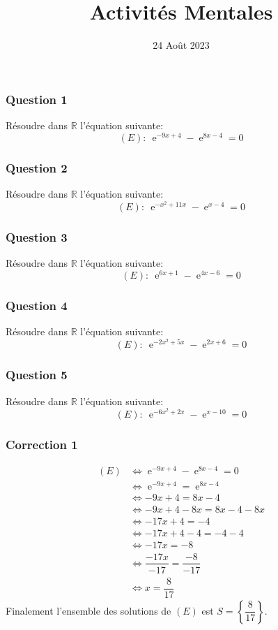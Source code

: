 \documentclass[15pt, mathserif]{beamer}
\title{Activités Mentales}
\date{24 Août 2023}
\DeclareMathOperator{\e}{e}
\begin{document}
\begin{frame}
    \titlepage
\end{frame}

\begin{frame} 
	\frametitle{Question 1}
	Résoudre dans $\mathbb{R}$ l'équation suivante: \[(E):~ \e^{-9x+4}-\e^{8x-4}=0\]\end{frame}


\begin{frame} 
	\frametitle{Question 2}
Résoudre dans $\mathbb{R}$ l'équation suivante: \[(E):~ \e^{ -x^2+11x}-\e^{x-4}=0 \] 

\end{frame}


\begin{frame} 
	\frametitle{Question 3}
	Résoudre dans $\mathbb{R}$ l'équation suivante: \[(E):~ \e^{6x+1}-\e^{4x-6}=0\]\end{frame}


\begin{frame} 
	\frametitle{Question 4}
Résoudre dans $\mathbb{R}$ l'équation suivante: \[(E):~ \e^{ -2x^2+5x}-\e^{2x+6}=0 \] 

\end{frame}


\begin{frame} 
	\frametitle{Question 5}
Résoudre dans $\mathbb{R}$ l'équation suivante: \[(E):~ \e^{ -6x^2+2x}-\e^{x-10}=0 \] 

\end{frame}


\begin{frame}
\vspace{-10mm}
	\frametitle{Correction 1}
	\begin{align*} (E)& \Leftrightarrow \e^{-9x+4}-\e^{8x-4}=0 \\
		&\Leftrightarrow \e^{-9x+4}=\e^{8x-4} \\
		&\Leftrightarrow -9x+4=8x-4\\
		&\Leftrightarrow -9x+4-8x=8x-4-8x\\
		&\Leftrightarrow -17x+4=-4\\
		&\Leftrightarrow -17x+4-4=-4-4\\
		&\Leftrightarrow -17x=-8\\
		&\Leftrightarrow \dfrac{-17x}{-17}=\dfrac{-8}{-17} \\
		&\Leftrightarrow x= \dfrac{8}{17}
	\end{align*}
	Finalement l'ensemble des solutions de $(E)$ est $S = \left\{\dfrac{8}{17}\right\}$.
\end{frame}
\end{document}
